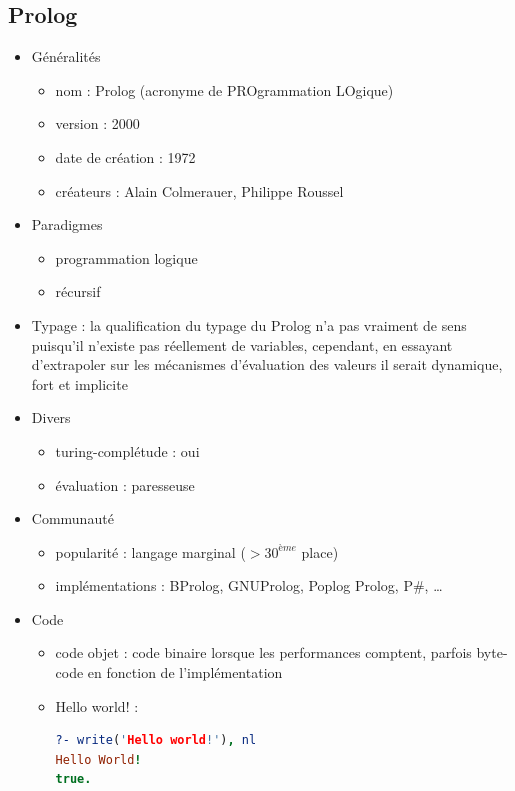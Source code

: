 \newpage

\subsection{Prolog}

\renewcommand{\labelitemi}{\textbullet}
\begin{itemize}
\item Généralités
	\begin{itemize}
	\item nom : Prolog (acronyme de PROgrammation LOgique)
	\item version : 2000
	\item date de création : 1972
	\item créateurs : Alain Colmerauer, Philippe Roussel\\
	\end{itemize}
\item Paradigmes
	\begin{itemize}
	\item programmation logique
	\item récursif\\
	\end{itemize}
\item Typage : la qualification du typage du Prolog n'a pas vraiment de sens puisqu'il n'existe pas réellement de variables, cependant, en essayant d'extrapoler sur les mécanismes d'évaluation des valeurs il serait dynamique, fort et implicite\\
\item Divers
	\begin{itemize}
	\item turing-complétude : oui
	\item évaluation : paresseuse\\
	\end{itemize}
\item Communauté
	\begin{itemize}
	\item popularité : langage marginal ($> 30^{ème}$ place)
	\item implémentations : BProlog, GNUProlog, Poplog Prolog, P\#, …\\
	\end{itemize}
\item Code
	\begin{itemize}
	\item code objet : code binaire lorsque les performances comptent, parfois byte-code en fonction de l'implémentation
	\item Hello world! :
\begin{lstlisting}[language=prolog]
?- write('Hello world!'), nl
Hello World!
true.
\end{lstlisting}
	\end{itemize}
\end{itemize}

